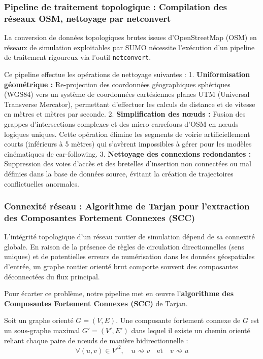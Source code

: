 \documentclass[10pt, a4paper]{article}
\begin{document}
\subsubsection{Pipeline de traitement topologique : Compilation des
réseaux OSM, nettoyage par
netconvert}\label{pipeline-de-traitement-topologique-compilation-des-ruxe9seaux-osm-nettoyage-par-netconvert}

La conversion de données topologiques brutes issues d'OpenStreetMap
(OSM) en réseaux de simulation exploitables par SUMO nécessite
l'exécution d'un pipeline de traitement rigoureux via l'outil
\texttt{netconvert}.

Ce pipeline effectue les opérations de nettoyage suivantes : 1.
\textbf{Uniformisation géométrique :} Re-projection des coordonnées
géographiques sphériques (WGS84) vers un système de coordonnées
cartésiennes planes UTM (Universal Transverse Mercator), permettant
d'effectuer les calculs de distance et de vitesse en mètres et mètres
par seconde. 2. \textbf{Simplification des nœuds :} Fusion des grappes
d'intersections complexes et des micro-carrefours d'OSM en nœuds
logiques uniques. Cette opération élimine les segments de voirie
artificiellement courts (inférieurs à 5 mètres) qui s'avèrent
impossibles à gérer pour les modèles cinématiques de car-following. 3.
\textbf{Nettoyage des connexions redondantes :} Suppression des voies
d'accès et des bretelles d'insertion non connectées ou mal définies dans
la base de données source, évitant la création de trajectoires
conflictuelles anormales.

\subsubsection{Connexité réseau : Algorithme de Tarjan pour l'extraction
des Composantes Fortement Connexes
(SCC)}\label{connexituxe9-ruxe9seau-algorithme-de-tarjan-pour-lextraction-des-composantes-fortement-connexes-scc}

L'intégrité topologique d'un réseau routier de simulation dépend de sa
connexité globale. En raison de la présence de règles de circulation
directionnelles (sens uniques) et de potentielles erreurs de
numérisation dans les données géospatiales d'entrée, un graphe routier
orienté brut comporte souvent des composantes déconnectées du flux
principal.

Pour écarter ce problème, notre pipeline met en œuvre
l'\textbf{algorithme des Composantes Fortement Connexes (SCC)} de
Tarjan.

Soit un graphe orienté \(G = (V, E)\). Une composante fortement connexe
de \(G\) est un sous-graphe maximal \(G' = (V', E')\) dans lequel il
existe un chemin orienté reliant chaque paire de nœuds de manière
bidirectionnelle :
\[\forall (u, v) \in V'^2, \quad u \rightsquigarrow v \quad \text{et} \quad v \rightsquigarrow u\]
\end{document}
